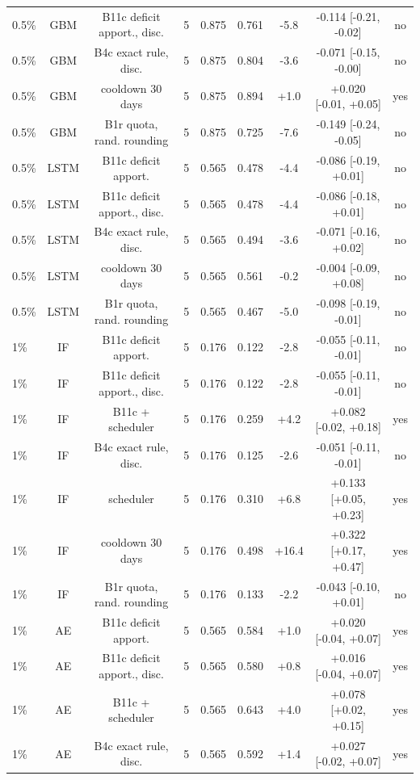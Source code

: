 \documentclass[10pt,onecolumn,letterpaper]{article}
\begin{document}
\begin{table}[!t]
{\begin{tabular}{lcccccccc}
0.5\% & GBM & B11c deficit apport., disc. & 5 & 0.875 & 0.761 & -5.8 & -0.114 [-0.21, -0.02] & no \\
0.5\% & GBM & B4c exact rule, disc. & 5 & 0.875 & 0.804 & -3.6 & -0.071 [-0.15, -0.00] & no \\
0.5\% & GBM & cooldown 30 days & 5 & 0.875 & 0.894 & +1.0 & +0.020 [-0.01, +0.05] & yes \\
0.5\% & GBM & B1r quota, rand. rounding & 5 & 0.875 & 0.725 & -7.6 & -0.149 [-0.24, -0.05] & no \\
0.5\% & LSTM & B11c deficit apport. & 5 & 0.565 & 0.478 & -4.4 & -0.086 [-0.19, +0.01] & no \\
0.5\% & LSTM & B11c deficit apport., disc. & 5 & 0.565 & 0.478 & -4.4 & -0.086 [-0.18, +0.01] & no \\
0.5\% & LSTM & B4c exact rule, disc. & 5 & 0.565 & 0.494 & -3.6 & -0.071 [-0.16, +0.02] & no \\
0.5\% & LSTM & cooldown 30 days & 5 & 0.565 & 0.561 & -0.2 & -0.004 [-0.09, +0.08] & no \\
0.5\% & LSTM & B1r quota, rand. rounding & 5 & 0.565 & 0.467 & -5.0 & -0.098 [-0.19, -0.01] & no \\
1\% & IF & B11c deficit apport. & 5 & 0.176 & 0.122 & -2.8 & -0.055 [-0.11, -0.01] & no \\
1\% & IF & B11c deficit apport., disc. & 5 & 0.176 & 0.122 & -2.8 & -0.055 [-0.11, -0.01] & no \\
1\% & IF & B11c + scheduler & 5 & 0.176 & 0.259 & +4.2 & +0.082 [-0.02, +0.18] & yes \\
1\% & IF & B4c exact rule, disc. & 5 & 0.176 & 0.125 & -2.6 & -0.051 [-0.11, -0.01] & no \\
1\% & IF & scheduler & 5 & 0.176 & 0.310 & +6.8 & +0.133 [+0.05, +0.23] & yes \\
1\% & IF & cooldown 30 days & 5 & 0.176 & 0.498 & +16.4 & +0.322 [+0.17, +0.47] & yes \\
1\% & IF & B1r quota, rand. rounding & 5 & 0.176 & 0.133 & -2.2 & -0.043 [-0.10, +0.01] & no \\
1\% & AE & B11c deficit apport. & 5 & 0.565 & 0.584 & +1.0 & +0.020 [-0.04, +0.07] & yes \\
1\% & AE & B11c deficit apport., disc. & 5 & 0.565 & 0.580 & +0.8 & +0.016 [-0.04, +0.07] & yes \\
1\% & AE & B11c + scheduler & 5 & 0.565 & 0.643 & +4.0 & +0.078 [+0.02, +0.15] & yes \\
1\% & AE & B4c exact rule, disc. & 5 & 0.565 & 0.592 & +1.4 & +0.027 [-0.02, +0.07] & yes \\

\end{tabular}}
\end{table}
\end{document}

